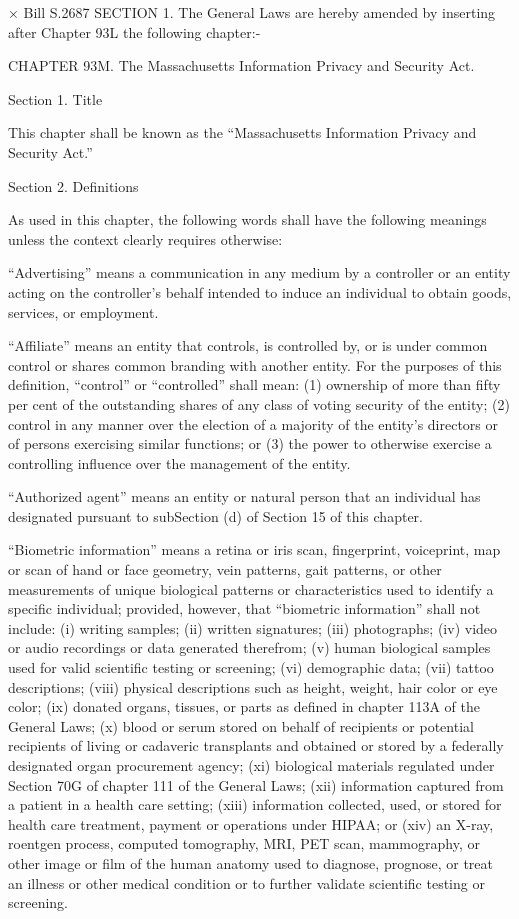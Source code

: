 ×
Bill S.2687
SECTION 1. The General Laws are hereby amended by inserting after Chapter 93L the following chapter:-

CHAPTER 93M. The Massachusetts Information Privacy and Security Act.

Section 1. Title

This chapter shall be known as the “Massachusetts Information Privacy and Security Act.” 

Section 2. Definitions

As used in this chapter, the following words shall have the following meanings unless the context clearly requires otherwise:

“Advertising” means a communication in any medium by a controller or an entity acting on the controller’s behalf intended to induce an individual to obtain goods, services, or employment.

“Affiliate” means an entity that controls, is controlled by, or is under common control or shares common branding with another entity. For the purposes of this definition, “control” or “controlled” shall mean: (1) ownership of more than fifty per cent of the outstanding shares of any class of voting security of the entity; (2) control in any manner over the election of a majority of the entity’s directors or of persons exercising similar functions; or (3) the power to otherwise exercise a controlling influence over the management of the entity.

“Authorized agent” means an entity or natural person that an individual has designated pursuant to subSection (d) of Section 15 of this chapter.

“Biometric information” means a retina or iris scan, fingerprint, voiceprint, map or scan of hand or face geometry, vein patterns, gait patterns, or other measurements of unique biological patterns or characteristics used to identify a specific individual; provided, however, that “biometric information” shall not include: (i) writing samples; (ii) written signatures; (iii) photographs; (iv) video or audio recordings or data generated therefrom; (v) human biological samples used for valid scientific testing or screening; (vi) demographic data; (vii) tattoo descriptions; (viii) physical descriptions such as height, weight, hair color or eye color; (ix) donated organs, tissues, or parts as defined in chapter 113A of the General Laws; (x) blood or serum stored on behalf of recipients or potential recipients of living or cadaveric transplants and obtained or stored by a federally designated organ procurement agency; (xi) biological materials regulated under Section 70G of chapter 111 of the General Laws; (xii) information captured from a patient in a health care setting; (xiii) information collected, used, or stored for health care treatment, payment or operations under HIPAA; or (xiv) an X-ray, roentgen process, computed tomography, MRI, PET scan, mammography, or other image or film of the human anatomy used to diagnose, prognose, or treat an illness or other medical condition or to further validate scientific testing or screening.

